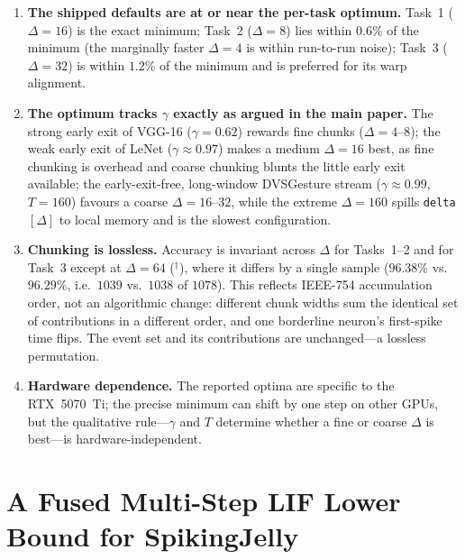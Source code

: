 \documentclass[runningheads]{llncs}
\begin{document}
\begin{enumerate}
  \item \textbf{The shipped defaults are at or near the per-task optimum.}
    Task~1 ($\Delta=16$) is the exact minimum; Task~2 ($\Delta=8$) lies within
    $0.6\%$ of the minimum (the marginally faster $\Delta=4$ is within run-to-run
    noise); Task~3 ($\Delta=32$) is within $1.2\%$ of the minimum and is preferred
    for its warp alignment.
  \item \textbf{The optimum tracks $\gamma$ exactly as argued in the main paper.}
    The strong early exit of VGG-16 ($\gamma=0.62$) rewards fine chunks
    ($\Delta=4$--$8$); the weak early exit of LeNet ($\gamma\approx0.97$) makes a
    medium $\Delta=16$ best, as fine chunking is overhead and coarse chunking
    blunts the little early exit available; the early-exit-free, long-window
    DVSGesture stream ($\gamma\approx0.99$, $T=160$) favours a coarse
    $\Delta=16$--$32$, while the extreme $\Delta=160$ spills
    \texttt{delta}$[\Delta]$ to local memory and is the slowest configuration.
  \item \textbf{Chunking is lossless.} Accuracy is invariant across $\Delta$ for
    Tasks~1--2 and for Task~3 except at $\Delta=64$ ($^{\dagger}$), where it
    differs by a single sample ($96.38\%$ vs.\ $96.29\%$, i.e.\ $1039$ vs.\ $1038$
    of $1078$). This reflects IEEE-754 accumulation order, not an algorithmic
    change: different chunk widths sum the identical set of contributions in a
    different order, and one borderline neuron's first-spike time flips. The event
    set and its contributions are unchanged---a lossless permutation.
  \item \textbf{Hardware dependence.} The reported optima are specific to the
    RTX~5070~Ti; the precise minimum can shift by one step on other GPUs, but the
    qualitative rule---$\gamma$ and $T$ determine whether a fine or coarse $\Delta$
    is best---is hardware-independent.
\end{enumerate}

\section{A Fused Multi-Step LIF Lower Bound for SpikingJelly}\label{app:sjfused}
\end{document}
